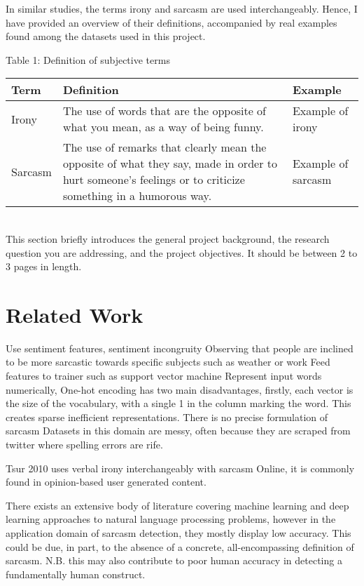 \documentclass[12pt,a4paper]{article}
\begin{document}
In similar studies, the terms irony and sarcasm are used interchangeably. Hence, I have provided an overview of their definitions, accompanied by real examples found among the datasets used in this project.

\begin{center}
	Table 1: Definition of subjective terms
\end{center}
\begin{tabular}{p{3cm}p{8cm}p{5cm}}
	\hline
	\textbf{Term} & \textbf{Definition} & \textbf{Example}\\
	\hline\hline
	Irony & The use of words that are the opposite of what you mean, as a way of being funny. \cite{cambridgeirony2020} &  Example of irony\\
	\hline
	Sarcasm & The use of remarks that clearly mean the opposite of what they say, made in order to hurt someone's feelings or to criticize something in a humorous way. \cite{cambridgesarcasm2020} &  Example of sarcasm\\
	\hline
\end{tabular}\\

This section briefly introduces the general project background, the research question you are addressing, and the project objectives.  It should be between 2 to 3 pages in length.\\



\section{Related Work}
Use sentiment features, sentiment incongruity
Observing that people are inclined to be more sarcastic towards specific subjects such as weather or work
Feed features to trainer such as support vector machine
Represent input words numerically, 
One-hot encoding has two main disadvantages, firstly, each vector is the size of the vocabulary, with a single 1 in the column marking the word. This creates sparse inefficient representations.
There is no precise formulation of sarcasm
Datasets in this domain are messy, often because they are scraped from twitter where spelling errors are rife.

Tsur 2010 uses verbal irony interchangeably with sarcasm
Online, it is commonly found in opinion-based user generated content.



\noindent There exists an extensive body of literature covering machine learning and deep learning approaches to natural language processing problems, however in the application domain of sarcasm detection, they mostly display low accuracy. This could be due, in part, to the absence of a concrete, all-encompassing definition of sarcasm. N.B. this may also contribute to poor human accuracy in detecting a fundamentally human construct. \\
\end{document}
